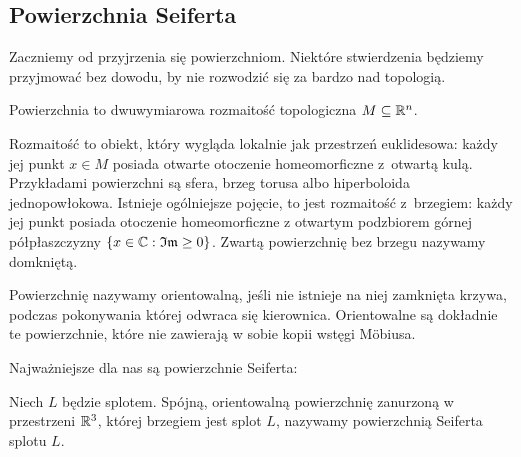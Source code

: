 
\subsection{Powierzchnia Seiferta}
Zaczniemy od przyjrzenia się powierzchniom.
Niektóre stwierdzenia będziemy przyjmować bez dowodu, by nie rozwodzić się za bardzo nad topologią.

\begin{definition}
    Powierzchnia to dwuwymiarowa rozmaitość topologiczna $M \subseteq \mathbb R^n$.
\end{definition}

Rozmaitość to obiekt, który wygląda lokalnie jak przestrzeń euklidesowa: każdy jej punkt $x \in M$ posiada otwarte otoczenie homeomorficzne z~otwartą kulą.
Przykładami powierzchni są sfera, brzeg torusa albo hiperboloida jednopowłokowa.
Istnieje ogólniejsze pojęcie, to jest rozmaitość z~brzegiem: każdy jej punkt posiada otoczenie homeomorficzne z otwartym podzbiorem górnej półpłaszczyzny $\{x \in \mathbb C: \mathfrak {Im} \ge 0\}$.
Zwartą powierzchnię bez brzegu nazywamy domkniętą.

Powierzchnię nazywamy orientowalną, jeśli nie istnieje na niej zamknięta krzywa, podczas pokonywania której odwraca się kierownica.
Orientowalne są dokładnie te powierzchnie, które nie zawierają w sobie kopii wstęgi Möbiusa.

%
Najważniejsze dla nas są powierzchnie Seiferta:

\begin{definition}
    Niech $L$ będzie splotem.
    Spójną, orientowalną powierzchnię zanurzoną w przestrzeni $\mathbb R^3$, której brzegiem jest splot $L$, nazywamy powierzchnią Seiferta splotu $L$.
\end{definition}


